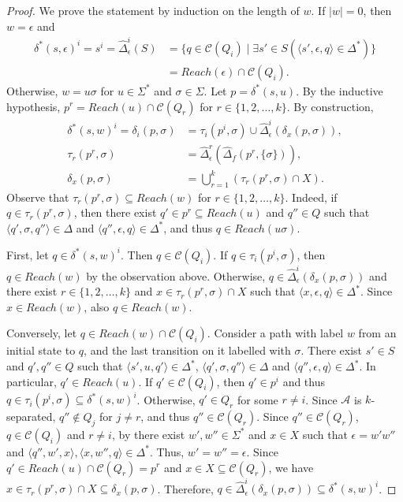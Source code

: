 \begin{proof}
  We prove the statement by induction on the length of $w$. If $|w| = 0$, then $w =
  \epsilon$ and
  \begin{align*}
    \delta^*(s, \epsilon)^i = s^i = \hat{\Delta}_\epsilon^i(S) &= \{ q \in
    \mathcal{C}(Q_i) \mid \exists s' \in S (\langle s', \epsilon, q \rangle \in
    \Delta^*) \}\\
    &= Reach(\epsilon) \cap \mathcal{C}(Q_i).
  \end{align*}
  Otherwise, $w = u\sigma$ for $u \in \Sigma^*$ and $\sigma \in \Sigma$. Let $p =
  \delta^*(s, u)$. By the inductive hypothesis, $p^r = Reach(u) \cap
  \mathcal{C}(Q_r)$ for $r \in \{ 1, 2, \ldots, k \}$. By construction,
  \begin{align*}
    \delta^*(s, w)^i = \delta_i(p, \sigma) &= \tau_i(p^i, \sigma) \cup
    \hat{\Delta}_\epsilon^i(\delta_x(p, \sigma)),\\
    \tau_r(p^r, \sigma) &= \hat{\Delta}_\epsilon^r(\hat{\Delta}_f(p^r, \{ \sigma
    \})),\\
    \delta_x(p, \sigma) &= \bigcup_{r=1}^k (\tau_r(p^r, \sigma) \cap X).
  \end{align*}
  Observe that $\tau_r(p^r, \sigma) \subseteq Reach(w)$ for $r \in \{ 1, 2, \ldots, k
  \}$. Indeed, if $q \in \tau_r(p^r, \sigma)$, then there exist $q' \in p^r \subseteq
  Reach(u)$ and $q'' \in Q$ such that $\langle q', \sigma, q'' \rangle \in \Delta$ and
  $\langle q'', \epsilon, q \rangle \in \Delta^*$, and thus $q \in Reach(u\sigma)$.

  First, let $q \in \delta^*(s, w)^i$. Then $q \in \mathcal{C}(Q_i)$. If $q \in
  \tau_i(p^i, \sigma)$, then $q \in Reach(w)$ by the observation above. Otherwise, $q
  \in \hat{\Delta}_\epsilon^i(\delta_x(p, \sigma))$ and there exist $r \in \{ 1, 2,
  \ldots, k \}$ and $x \in \tau_r(p^r, \sigma) \cap X$ such that $\langle x,
  \epsilon, q \rangle \in \Delta^*$. Since $x \in Reach(w)$, also $q \in Reach(w)$.

  Conversely, let $q \in Reach(w) \cap \mathcal{C}(Q_i)$. Consider a path with label
  $w$ from an initial state to $q$, and the last transition on it labelled with
  $\sigma$. There exist $s' \in S$ and $q', q'' \in Q$ such that $\langle s', u, q'
  \rangle \in \Delta^*$, $\langle q', \sigma, q'' \rangle \in \Delta$ and $\langle
  q'', \epsilon, q \rangle \in \Delta^*$. In particular, $q' \in Reach(u)$. If $q'
  \in \mathcal{C}(Q_i)$, then $q' \in p^i$ and thus $q \in \tau_i(p^i, \sigma)
  \subseteq \delta^*(s, w)^i$. Otherwise, $q' \in Q_r$ for some $r \neq i$. Since
  $\mathcal{A}$ is $k$-separated, $q'' \not\in Q_j$ for $j \neq r$, and thus $q'' \in
  \mathcal{C}(Q_r)$. Since $q'' \in \mathcal{C}(Q_r)$, $q \in \mathcal{C}(Q_i)$ and $r
  \neq i$, by  there exist $w', w'' \in \Sigma^*$ and $x \in
  X$ such that $\epsilon = w'w''$ and $\langle q'', w', x \rangle, \langle x, w'', q
  \rangle \in \Delta^*$. Thus, $w' = w'' = \epsilon$. Since $q' \in Reach(u) \cap
  \mathcal{C}(Q_r) = p^r$ and $x \in X \subseteq \mathcal{C}(Q_r)$, we have $x \in
  \tau_r(p^r, \sigma) \cap X \subseteq \delta_x(p, \sigma)$. Therefore, $q \in
  \hat{\Delta}_\epsilon^i(\delta_x(p, \sigma)) \subseteq \delta^*(s, w)^i$.
\end{proof}

